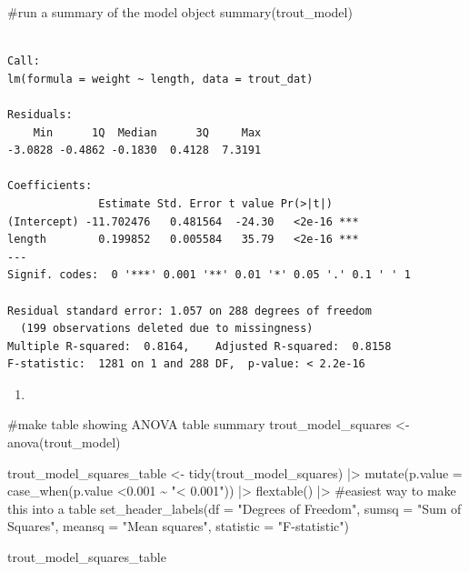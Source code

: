 \documentclass[
  letterpaper,
  DIV=11,
  numbers=noendperiod]{scrartcl}
\newenvironment{Shaded}{\begin{snugshade}}{\end{snugshade}}
\newcommand{\AttributeTok}[1]{\textcolor[rgb]{0.40,0.45,0.13}{#1}}
\newcommand{\CommentTok}[1]{\textcolor[rgb]{0.37,0.37,0.37}{#1}}
\newcommand{\FloatTok}[1]{\textcolor[rgb]{0.68,0.00,0.00}{#1}}
\newcommand{\FunctionTok}[1]{\textcolor[rgb]{0.28,0.35,0.67}{#1}}
\newcommand{\NormalTok}[1]{\textcolor[rgb]{0.00,0.23,0.31}{#1}}
\newcommand{\OtherTok}[1]{\textcolor[rgb]{0.00,0.23,0.31}{#1}}
\newcommand{\SpecialCharTok}[1]{\textcolor[rgb]{0.37,0.37,0.37}{#1}}
\newcommand{\StringTok}[1]{\textcolor[rgb]{0.13,0.47,0.30}{#1}}
\providecommand{\tightlist}{%
  \setlength{\itemsep}{0pt}\setlength{\parskip}{0pt}}\usepackage{longtable,booktabs,array}
\begin{document}
\begin{Shaded}
\begin{Highlighting}[]
\CommentTok{\#run a summary of the model object }
\FunctionTok{summary}\NormalTok{(trout\_model)}
\end{Highlighting}
\end{Shaded}

\begin{verbatim}

Call:
lm(formula = weight ~ length, data = trout_dat)

Residuals:
    Min      1Q  Median      3Q     Max 
-3.0828 -0.4862 -0.1830  0.4128  7.3191 

Coefficients:
              Estimate Std. Error t value Pr(>|t|)    
(Intercept) -11.702476   0.481564  -24.30   <2e-16 ***
length        0.199852   0.005584   35.79   <2e-16 ***
---
Signif. codes:  0 '***' 0.001 '**' 0.01 '*' 0.05 '.' 0.1 ' ' 1

Residual standard error: 1.057 on 288 degrees of freedom
  (199 observations deleted due to missingness)
Multiple R-squared:  0.8164,    Adjusted R-squared:  0.8158 
F-statistic:  1281 on 1 and 288 DF,  p-value: < 2.2e-16
\end{verbatim}

\begin{enumerate}
\def\labelenumi{\arabic{enumi}.}
\setcounter{enumi}{6}
\tightlist
\item
\end{enumerate}

\begin{Shaded}
\begin{Highlighting}[]
\CommentTok{\#make table showing ANOVA table summary }
\NormalTok{trout\_model\_squares }\OtherTok{\textless{}{-}} \FunctionTok{anova}\NormalTok{(trout\_model)}


\NormalTok{trout\_model\_squares\_table }\OtherTok{\textless{}{-}} \FunctionTok{tidy}\NormalTok{(trout\_model\_squares) }\SpecialCharTok{|\textgreater{}} 
                       \FunctionTok{mutate}\NormalTok{(}\AttributeTok{p.value =} \FunctionTok{case\_when}\NormalTok{(p.value }\SpecialCharTok{\textless{}}\FloatTok{0.001} \SpecialCharTok{\textasciitilde{}} \StringTok{"\textless{} 0.001"}\NormalTok{)) }\SpecialCharTok{|\textgreater{}}
                       \FunctionTok{flextable}\NormalTok{() }\SpecialCharTok{|\textgreater{}}  \CommentTok{\#easiest way to make this into a table }
                       \FunctionTok{set\_header\_labels}\NormalTok{(}\AttributeTok{df =} \StringTok{"Degrees of Freedom"}\NormalTok{, }\AttributeTok{sumsq =} \StringTok{"Sum of Squares"}\NormalTok{,                        }\AttributeTok{meansq =} \StringTok{"Mean squares"}\NormalTok{, }\AttributeTok{statistic =} \StringTok{"F{-}statistic"}\NormalTok{)}

\NormalTok{trout\_model\_squares\_table}
\end{Highlighting}
\end{Shaded}
\end{document}
